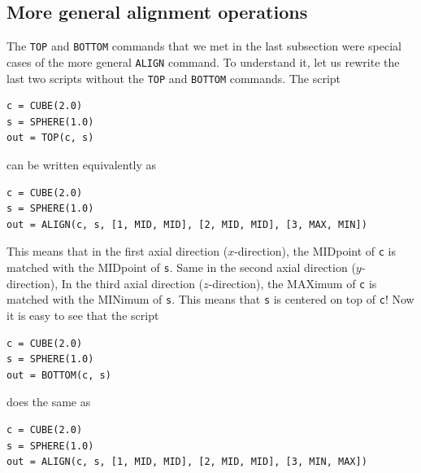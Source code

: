 \subsection{More general alignment operations}

The {\tt TOP} and {\tt BOTTOM} commands that we met in the last subsection 
were special cases of the more general {\tt ALIGN} command. To understand it, 
let us rewrite the last two scripts without the {\tt TOP} and {\tt BOTTOM}
commands. The script \\

\begin{bbox}
\begin{verbatim}
c = CUBE(2.0)
s = SPHERE(1.0)
out = TOP(c, s)
\end{verbatim}
\end{bbox}
\vspace{6mm}

\noindent
can be written equivalently as\\

\begin{bbox}
\begin{verbatim}
c = CUBE(2.0)
s = SPHERE(1.0)
out = ALIGN(c, s, [1, MID, MID], [2, MID, MID], [3, MAX, MIN])
\end{verbatim}
\end{bbox}
\vspace{6mm}

\noindent
This means that in the first axial direction ($x$-direction), the MIDpoint of {\tt c} is matched 
with the MIDpoint of {\tt s}. Same in the second axial direction ($y$-direction), In the 
third axial direction ($z$-direction), the MAXimum of {\tt c} is matched with the MINimum of {\tt s}.
This means that {\tt s} is centered on top of {\tt c}! Now it is easy to see that the 
script \\

\begin{bbox}
\begin{verbatim}
c = CUBE(2.0)
s = SPHERE(1.0)
out = BOTTOM(c, s)
\end{verbatim}
\end{bbox}
\vspace{6mm}

\noindent
does the same as \\

\begin{bbox}
\begin{verbatim}
c = CUBE(2.0)
s = SPHERE(1.0)
out = ALIGN(c, s, [1, MID, MID], [2, MID, MID], [3, MIN, MAX])
\end{verbatim}
\end{bbox}
\vspace{6mm}

